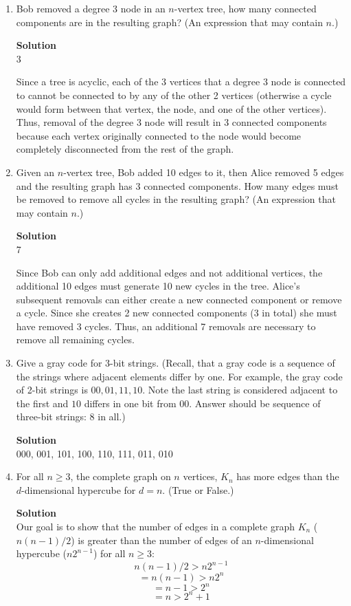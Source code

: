 \documentclass[11pt]{article}
\newenvironment{Parts}{\begin{enumerate}[label=(\alph*)]}{\end{enumerate}}
\newcommand*{\Part}{\item}
\newenvironment{Answer}{\vspace{10pt}\begin{mdframed}\textbf{Solution}\\}{\end{mdframed}\vfill\pagebreak[3]}
\newenvironment{Answer}{\vspace{10pt}}{\vfill\pagebreak[3]}
\begin{document}
\begin{Parts}

\Part
Bob removed a degree $3$ node in an $n$-vertex tree, how many connected
components are in the resulting graph?  (An expression that may
contain $n$.)

\begin{Answer}
3

Since a tree is acyclic, each of the 3 vertices that a degree 3 node is connected to cannot be connected to by any of the other 2 vertices  (otherwise a cycle would form between that vertex, the node, and one of the other vertices). Thus, removal of the degree 3 node will result in 3 connected components because each vertex originally connected to the node would become completely disconnected from the rest of the graph.
\end{Answer}

\Part
Given an $n$-vertex tree, Bob added 10 edges to it, then Alice removed 
5 edges and the resulting graph has 3 connected components.
How many edges must be removed to remove all cycles
in the resulting graph? (An expression that may contain $n$.)

\begin{Answer}
7

Since Bob can only add additional edges and not additional vertices, the additional 10 edges must generate 10 new cycles in the tree. Alice's subsequent removals can either create a new connected component or remove a cycle. Since she creates 2 new connected components (3 in total) she must have removed 3 cycles. Thus, an additional 7 removals are necessary to remove all remaining cycles.
\end{Answer}

\Part
Give a gray code for 3-bit strings. (Recall, that a gray code is a
sequence of the strings where adjacent elements differ by one.  For
example, the gray code of 2-bit strings is $00,01,11,10$.  Note the
last string is considered adjacent to the first and $10$ differs in
one bit from $00$. Answer should be sequence of three-bit strings: 8
in all.)

\begin{Answer}
000, 001, 101, 100, 110, 111, 011, 010
\end{Answer}

\Part
For all $n \geq 3$, the complete graph on $n$ vertices, $K_n$ has more
edges than the $d$-dimensional hypercube for $d=n$. (True or False.)

\begin{Answer}
Our goal is to show that the number of edges in a complete graph $K_n$ ($n(n-1)/2$) is greater than the number of edges of an $n$-dimensional hypercube ($n2^{n-1}$) for all $n\geq3$: $$ n(n-1)/2 > n2^{n-1}$$ $$= n(n-1) > n2^n$$ $$= n-1 > 2^n$$ $$= n>2^n+1$$


\end{Answer}
\end{Parts}
\end{document}
